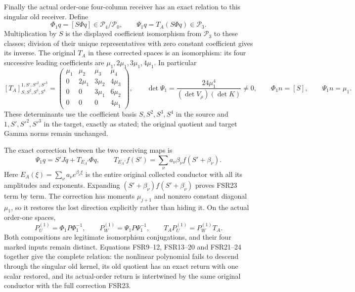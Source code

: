 \documentclass[11pt]{article}
\begin{document}
Finally the actual order-one four-column receiver has an exact
relation to this singular old receiver. Define
\[
 \Phi_1q=[S\Phi q]\in\mathcal P_4/\mathcal P_0,
 \qquad \Psi_1q=T_A(S\Phi q)\in\mathcal P_3.
 \tag{FSR21}
\]
Multiplication by $S$ is the displayed coefficient isomorphism
from $\mathcal P_3$ to these classes; division of their unique
representatives with zero constant coefficient gives its inverse.
The original $T_A$ in these corrected spaces is an isomorphism:
its four successive leading coefficients are
$\mu_1,2\mu_1,3\mu_1,4\mu_1$. In particular
\[
 [T_A]_{S,S^2,S^3,S^4}^{1,S',S'^2,S'^3}=
 \begin{pmatrix}
 \mu_1&\mu_2&\mu_3&\mu_4\\
 0&2\mu_1&3\mu_2&4\mu_3\\
 0&0&3\mu_1&6\mu_2\\
 0&0&0&4\mu_1
 \end{pmatrix},\qquad
 \det\Psi_1=\frac{24\mu_1^4}{(\det V_\rho)(\det K)}\ne0,
 \qquad \Phi_1n=[S],\qquad \Psi_1n=\mu_1.
 \tag{FSR22}
\]
These determinants use the coefficient basis $S,S^2,S^3,S^4$
in the source and $1,S',S'^2,S'^3$ in the target, exactly as stated;
the original quotient and target Gamma norms remain unchanged.

The exact correction between the two receiving maps is
\[
 \Psi_1q=S'Jq+T_{E_A'}\Phi q,\qquad
 T_{E_A'}f(S')=\sum_\nu a_\nu\beta_\nu f(S'+\beta_\nu).
 \tag{FSR23}
\]
Here $E_A(\xi)=\sum_\nu a_\nu e^{\beta_\nu\xi}$ is the entire
original collected conductor with all its amplitudes and exponents.
Expanding $(S'+\beta_\nu)f(S'+\beta_\nu)$ proves FSR23 term
by term. The correction has moments $\mu_{j+1}$ and nonzero
constant diagonal $\mu_1$, so it restores the lost direction
explicitly rather than hiding it. On the actual order-one spaces,
\[
 P_U^{(1)}=\Phi_1P\Phi_1^{-1},\qquad
 P_W^{(1)}=\Psi_1P\Psi_1^{-1},\qquad
 T_AP_U^{(1)}=P_W^{(1)}T_A.
 \tag{FSR24}
\]
Both compositions are legitimate isomorphism conjugations, and
their four marked inputs remain distinct. Equations FSR9--12,
FSR13--20 and FSR21--24 together give the complete relation:
the nonlinear polynomial fails to descend through the singular
old kernel, its old quotient has an exact return with one scalar
restored, and its actual-order return is intertwined by the same
original conductor with the full correction FSR23.
\end{document}
